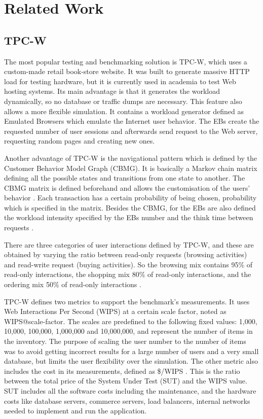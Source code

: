 \chapter{Related Work}
\label{chapter:chapter2}

\section{TPC-W}
\label{sec:tpcw}

The most popular testing and benchmarking solution is TPC-W, which uses a custom-made retail book-store website. It was built to generate massive HTTP load for testing hardware, but it is currently used in academia to test Web hosting systems. Its main advantage is that it generates the workload dynamically, so no database or traffic dumps are necessary. This feature also allows a more flexible simulation. It contains a workload generator defined as Emulated Browsers which emulate the Internet user behavior. The EBs create the requested number of user sessions and afterwards send request to the Web server, requesting random pages and creating new ones. 

Another advantage of TPC-W is the navigational pattern which is defined by the Customer Behavior Model Graph (CBMG). It is basically a Markov chain matrix defining all the possible states and transitions from one state to another. The CBMG matrix is defined beforehand and allows the customisation of the users' behavior \cite{Menasce}. Each transaction has a certain probability of being chosen, probability which is specified in the matrix. Besides the CBMG, for the EBs are also defined the workload intensity specified by the EBs number and the think time between requests \cite{Pierre}.

There are three categories of user interactions defined by TPC-W, and these are obtained by varying the ratio between read-only requests (browsing activities) and read-write request (buying activities). So the browsing mix contains 95\% of read-only interactions, the shopping mix 80\% of read-only interactions, and the  ordering mix 50\% of  read-only interactions \cite{Amza}.

TPC-W defines two metrics to support the benchmark's measurements. It uses Web Interactions Per Second (WIPS) at a certain scale factor, noted as WIPS@scale-factor. The scales are predefined to the following fixed values: 1,000, 10,000, 100,000, 1,000,000 and 10,000,000, and represent the number of items in the inventory. The purpose of scaling the user number to the number of items was to avoid getting incorrect results for a large number of users and a very small database, but limits the user flexibility over the simulation. The other metric also includes the cost in its measurements, defined as \$/WIPS \cite{Smith}. This is the ratio between the total price of the System Under Test (SUT) and the WIPS value. SUT includes all the software costs including the maintenance, and the hardware costs like database servers, commerce servers, load balancers, internal networks needed to implement and run the application.

